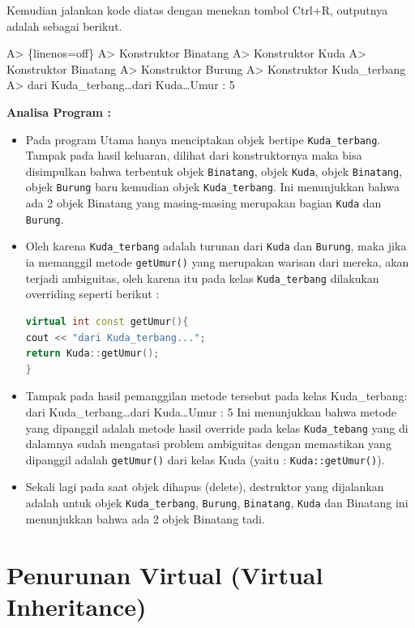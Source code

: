 Kemudian jalankan kode diatas dengan menekan tombol Ctrl+R, outputnya
adalah sebagai berikut.

A\textgreater{} \{linenos=off\} A\textgreater{} Konstruktor Binatang
A\textgreater{} Konstruktor Kuda A\textgreater{} Konstruktor Binatang
A\textgreater{} Konstruktor Burung A\textgreater{} Konstruktor
Kuda\_terbang A\textgreater{} dari Kuda\_terbang\ldots{}dari
Kuda\ldots{}Umur : 5

\textbf{Analisa Program :}

\begin{itemize}
\item
  Pada program Utama hanya menciptakan objek bertipe
  \texttt{Kuda\_terbang}. Tampak pada hasil keluaran, dilihat dari
  konstruktornya maka bisa disimpulkan bahwa terbentuk objek
  \texttt{Binatang}, objek \texttt{Kuda}, objek \texttt{Binatang}, objek
  \texttt{Burung} baru kemudian objek \texttt{Kuda\_terbang}. Ini
  menunjukkan bahwa ada 2 objek Binatang yang masing-masing merupakan
  bagian \texttt{Kuda} dan \texttt{Burung}.
\item
  Oleh karena \texttt{Kuda\_terbang} adalah turunan dari \texttt{Kuda}
  dan \texttt{Burung}, maka jika ia memanggil metode \texttt{getUmur()}
  yang merupakan warisan dari mereka, akan terjadi ambiguitas, oleh
  karena itu pada kelas \texttt{Kuda\_terbang} dilakukan overriding
  seperti berikut :

\begin{lstlisting}[language=c++, numbers=none]
virtual int const getUmur(){
cout << "dari Kuda_terbang...";
return Kuda::getUmur();
}
\end{lstlisting}
\item
  Tampak pada hasil pemanggilan metode tersebut pada kelas
  Kuda\_terbang: dari Kuda\_terbang\ldots{}dari Kuda\ldots{}Umur : 5 Ini
  menunjukkan bahwa metode yang dipanggil adalah metode hasil override
  pada kelas \texttt{Kuda\_tebang} yang di dalamnya sudah mengatasi
  problem ambiguitas dengan memastikan yang dipanggil adalah
  \texttt{getUmur()} dari kelas Kuda (yaitu : \texttt{Kuda::getUmur()}).
\item
  Sekali lagi pada saat objek dihapus (delete), destruktor yang
  dijalankan adalah untuk objek \texttt{Kuda\_terbang}, \texttt{Burung},
  \texttt{Binatang}, \texttt{Kuda} dan Binatang ini menunjukkan bahwa
  ada 2 objek Binatang tadi.
\end{itemize}

\section{Penurunan Virtual (Virtual
Inheritance)}\label{penurunan-virtual-virtual-inheritance}

